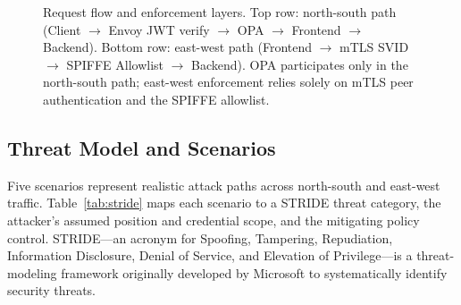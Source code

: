 \documentclass[conference]{IEEEtran}
\begin{document}
\begin{figure}[!t]
  \centering
  \caption{Request flow and enforcement layers. Top row: north-south path
(Client $\to$ Envoy JWT verify $\to$ OPA $\to$ Frontend $\to$ Backend).
Bottom row: east-west path (Frontend $\to$ mTLS SVID $\to$ SPIFFE Allowlist $\to$ Backend).
OPA participates only in the north-south path; east-west enforcement relies solely on
mTLS peer authentication and the SPIFFE allowlist.}
  \label{fig:arch}
\end{figure}

\subsection{Threat Model and Scenarios}
Five scenarios represent realistic attack paths across north-south and east-west traffic.
Table~\ref{tab:stride} maps each scenario to a STRIDE threat category, the attacker's
assumed position and credential scope, and the mitigating policy control. STRIDE---an
acronym for Spoofing, Tampering, Repudiation, Information Disclosure, Denial of Service,
and Elevation of Privilege---is a threat-modeling framework originally developed by
Microsoft to systematically identify security threats.
\end{document}
